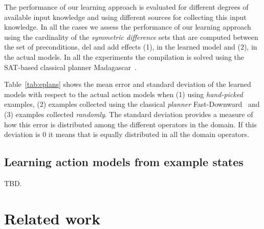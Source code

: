 \documentclass[letterpaper]{article} %
\begin{document}
The performance of our learning approach is evaluated for different degrees of available input knowledge and using different sources for collecting this input knowledge. In all the cases we assess the performance of our learning approach using the cardinality of the {\em symmetric difference} sets that are computed between the set of preconditions, del and add effects (1), in the learned model and (2), in the actual models. In all the experiments the compilation is solved using the SAT-based classical planner {\sc Madagascar}~\cite{rintanen2014madagascar}.

Table~\ref{tab:eplans} shows the mean error and standard deviation of the learned models with respect to the actual action models when (1) using {\em hand-picked} examples, (2) examples collected using the classical {\em planner} {\sc Fast-Downward}~\cite{helmert2006fast} and (3) examples collected {\em randomly}. The standard deviation provides a measure of how this error is distributed among the different operators in the domain. If this deviation is 0 it means that is equally distributed in all the domain operators.


\subsection{Learning action models from example states}
TBD.


\section{Related work}
\end{document}
